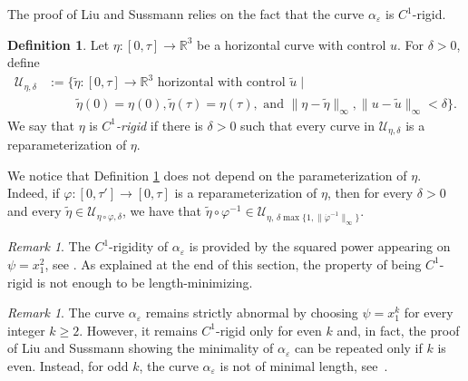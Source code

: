 \documentclass[12pt]{amsart}
\theoremstyle{plain}
\theoremstyle{definition}
\newtheorem{definition}[theorem]{Definition}
\theoremstyle{remark}
\newtheorem{remark}[theorem]{Remark}
\numberwithin{equation}{section}
\newcommand{\R}{\mathbb{R}}
\newcommand{\oo}{\infty}
\newcommand{\<}{\langle}
\renewcommand{\>}{\rangle}
\newcommand{\e}{\varepsilon}
\newcommand{\0}{\theta}
\renewcommand{\a}{\alpha}
\newcommand{\de}{\delta}
\newcommand{\1}{{-1}}
\renewcommand{\=}{\coloneqq}
\renewcommand{\.}{\dots}
\renewcommand{\-}{\cdot}
\renewcommand{\:}{\,:\,}
\newcommand{\mc}{\mathcal}
\theoremstyle{definition}
\begin{document}
The proof of Liu and Sussmann relies on the fact that the curve $\a_\e$ is $C^1$-rigid.






\begin{definition}
	\label{def:C1-rigid}
	Let $\eta:[0,\tau]\to\R^3$ be a horizontal curve with control $u$. For $\de>0$, define 
	\begin{equation}
		\begin{split}
			\mathcal U_{\eta,\de}&:=\big\{\tilde\eta:[0,\tau]\to\R^3 \text{ horizontal with control } \tilde u \mid \\ &\qquad\;\tilde\eta(0)=\eta(0), \tilde\eta(\tau)=\eta(\tau), \text{ and }
			\|\eta-\tilde\eta\|_\oo, \|u-\tilde u\|_\oo<\de\big\}.
		\end{split}
	\end{equation}
	We say that $\eta$ is {\em $C^1$-rigid} if there is $\de>0$ such that every curve in $\mathcal U_{\eta,\de}$ is a reparameterization of $\eta$.
\end{definition}

We notice that Definition \ref{def:C1-rigid} does not depend on the parameterization of $\eta$. Indeed, if $\varphi:[0,\tau']\to[0,\tau]$ is a reparameterization of $\eta$, then for every $\de>0$ and every $\tilde \eta \in\mc U_{\eta\circ\varphi,\de}$, we have that $\tilde\eta\circ\varphi^{-1}\in \mc U_{\eta,\,\de\max\{1,\|\dot\varphi^{-1}\|_\oo\}}$.

\begin{remark}
	\label{C1iso}
	The $C^1$-rigidity of $\a_\e$ is provided by the squared power appearing on $\psi=x_1^2$, see \cite[Chapter 3]{Mon02}. As explained at the end of this section, the property of being $C^1$-rigid is not enough to be length-minimizing.
\end{remark}

\begin{remark}
	The curve $\a_\e$ remains strictly abnormal by choosing $\psi=x_1^k$ for every integer $k\geq2$. However, it remains $C^1$-rigid only for even $k$ and, in fact, the proof of Liu and Sussmann showing the minimality of $\a_\e$ can be repeated only if $k$ is even. Instead, for odd $k$, the curve $\a_\e$ is not of minimal length, see~\cite[Theorem 10.1]{BMS24}.
\end{remark}


 
\end{document}
